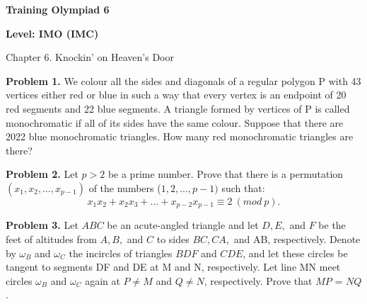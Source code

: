 \centerline{\Huge \bf  Training Olympiad 6}
\centerline{\Huge \bf Level: IMO (IMC)}

\begin{flushright}
    \scriptsize{Chapter 6. Knockin' on Heaven's Door}
\end{flushright}

\noindent\textbf{Problem 1.} We colour all the sides and diagonals of a regular polygon P with 43 vertices either red or blue in such a way that every vertex is an endpoint of 20 red segments and 22 blue segments. A triangle formed by vertices of P is called monochromatic if all of its sides have the same colour. Suppose that there are 2022 blue monochromatic triangles. How many red monochromatic triangles are there?

\noindent\textbf{Problem 2.} Let $p > 2$ be a prime number. Prove that there is a permutation $(x_1, x_2, \ldots, x_{p-1})$ of the numbers ($1, 2, ..., p - 1)$ such that:
\[x_1x_2 + x_2x_3 + \ldots + x_{p-2}x_{p-1} \equiv 2 \ (mod \ p).\]

\noindent\textbf{Problem 3.} Let $ABC$ be an acute-angled triangle and let $D, E,$ and $F$ be the feet of altitudes from $A, B,$ and $C$ to sides $BC, CA,$ and AB, respectively. Denote by $\omega_{B}$ and $\omega_{C}$ the incircles of triangles $BDF$ and $CDE$, and let these circles be tangent to segments DF and DE at M and N, respectively. Let line MN meet circles $\omega_{B}$ and $\omega_{C}$ again at $P \neq M$ and $Q \neq N$, respectively. Prove that $MP$ = $NQ$.